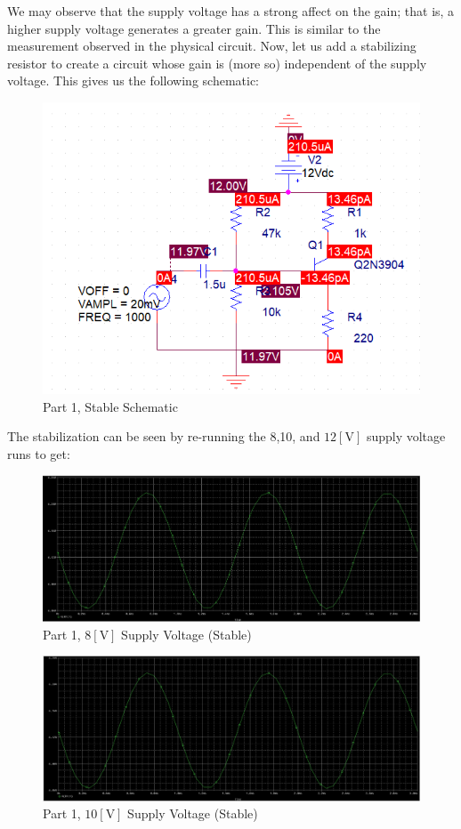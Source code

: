 \documentclass[
	letterpaper, %
	10pt, %
]{CSUniSchoolLabReport}
\begin{document}
We may observe that the supply voltage has a strong affect on the gain; that is, a higher supply voltage generates a greater gain. This is similar to the measurement observed in the physical circuit. Now, let us add a stabilizing resistor to create a circuit whose gain is (more so) independent of the supply voltage. This gives us the following schematic:

\begin{figure}[H]
  \centering
  \includegraphics[width=.8\textwidth]{Figures/L4F13}
  \caption{Part 1, Stable Schematic}
  \label{fig:15}
\end{figure}

The stabilization can be seen by re-running the 8,10, and $12[\si{\volt}]$ supply voltage runs to get:

\begin{figure}[H]
  \centering
  \includegraphics[width=.8\textwidth]{Figures/L4F14}
  \caption{Part 1, $8[\si{\volt}]$ Supply Voltage (Stable)}
  \label{fig:16}
\end{figure}

\begin{figure}[H]
  \centering
  \includegraphics[width=.8\textwidth]{Figures/L4F15}
  \caption{Part 1, $10[\si{\volt}]$ Supply Voltage (Stable)}
  \label{fig:17}
\end{figure}
\end{document}
